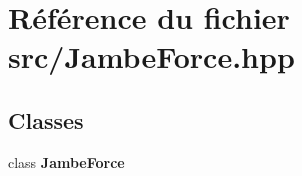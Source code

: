 \section{Référence du fichier src/\-Jambe\-Force.hpp}
\label{_jambe_force_8hpp}
\subsection*{Classes}
\begin{DoxyCompactItemize}
\item 
class {\bf Jambe\-Force}
\end{DoxyCompactItemize}
